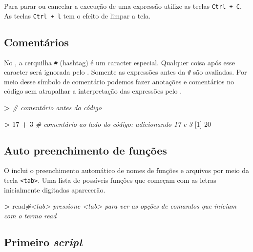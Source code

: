 \documentclass[]{book}
\newenvironment{Shaded}{\begin{snugshade}}{\end{snugshade}}
\newcommand{\DecValTok}[1]{\textcolor[rgb]{0.00,0.00,0.81}{#1}}
\newcommand{\StringTok}[1]{\textcolor[rgb]{0.31,0.60,0.02}{#1}}
\newcommand{\CommentTok}[1]{\textcolor[rgb]{0.56,0.35,0.01}{\textit{#1}}}
\newcommand{\OperatorTok}[1]{\textcolor[rgb]{0.81,0.36,0.00}{\textbf{#1}}}
\newcommand{\NormalTok}[1]{#1}
\begin{document}
Para parar ou cancelar a execução de uma expressão utilize as teclas
\texttt{Ctrl\ +\ C}. As teclas \texttt{Ctrl\ +\ l} tem o efeito de
limpar a tela.

\subsection{Comentários}\label{comentarios}

No , a cerquilha \texttt{\#} (hashtag) é um caracter especial. Qualquer
coisa após esse caracter será ignorada pelo . Somente as expressões
antes da \texttt{\#} são avaliadas. Por meio desse símbolo de comentário
podemos fazer anotações e comentários no código sem atrapalhar a
interpretação das expressões pelo .

\begin{Shaded}
\begin{Highlighting}[]
\OperatorTok{>}\StringTok{ }\CommentTok{# comentário antes do código }
\end{Highlighting}
\end{Shaded}

\begin{Shaded}
\begin{Highlighting}[]
\OperatorTok{>}\StringTok{ }\DecValTok{17} \OperatorTok{+}\StringTok{ }\DecValTok{3} \CommentTok{# comentário ao lado do código: adicionando 17 e 3}
\NormalTok{[}\DecValTok{1}\NormalTok{] }\DecValTok{20}
\end{Highlighting}
\end{Shaded}

\subsection{Auto preenchimento de
funções}\label{auto-preenchimento-de-funcoes}

O inclui o preenchimento automático de nomes de funções e arquivos por
meio da tecla \texttt{\textless{}tab\textgreater{}}. Uma lista de
possíveis funções que começam com as letras inicialmente digitadas
aparecerão.

\begin{Shaded}
\begin{Highlighting}[]
\OperatorTok{>}\StringTok{ }\NormalTok{read}\CommentTok{#<tab> pressione <tab> para ver as opções de comandos que iniciam com o termo read}
\end{Highlighting}
\end{Shaded}

\subsection{\texorpdfstring{Primeiro
\emph{script}}{Primeiro script}}\label{primeiro-script}
\end{document}
